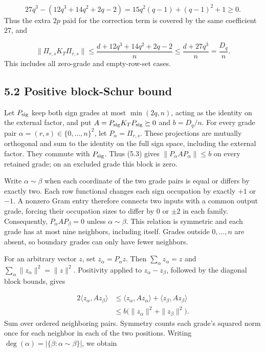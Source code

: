 \documentclass[11pt,a4paper]{article}
\begin{document}
\begin{equation*}
27q^3-(12q^3+14q^2+2q-2)
=15q^2(q-1)+(q-1)^2+1\ge0.
\end{equation*}
Thus the extra \(2p\) paid for the correction term is covered by the same coefficient \(27\), and

\begin{equation}
\|\Pi_{r,s}K_T\Pi_{r,s}\|
\le\frac{d+12q^3+14q^2+2q-2}{n}
\le\frac{d+27q^3}{n}
=\frac{D_q}{n}.
\tag{5.3}
\end{equation}
This includes all zero-grade and empty-row-set cases.

\subsection*{5.2 Positive block-Schur bound}
Let \(P_{\rm sig}\) keep both sign grades at most \(\min(2q,n)\), acting as the identity on the external factor, and put \(A=P_{\rm sig}K_TP_{\rm sig}\succeq0\) and \(b=D_q/n\). For every grade pair \(\alpha=(r,s)\in\{0,\ldots,n\}^2\), let \(P_\alpha=\Pi_{r,s}\). These projections are mutually orthogonal and sum to the identity on the full sign space, including the external factor. They commute with \(P_{\rm sig}\). Thus (5.3) gives \(\|P_\alpha A P_\alpha\|\le b\) on every retained grade; on an excluded grade this block is zero.

Write \(\alpha\sim\beta\) when each coordinate of the two grade pairs is equal or differs by exactly two. Each row functional changes each sign occupation by exactly \(+1\) or \(-1\). A nonzero Gram entry therefore connects two inputs with a common output grade, forcing their occupation sizes to differ by \(0\) or \(\pm2\) in each family. Consequently, \(P_\alpha A P_\beta=0\) unless \(\alpha\sim\beta\). This relation is symmetric and each grade has at most nine neighbors, including itself. Grades outside \(0,\ldots,n\) are absent, so boundary grades can only have fewer neighbors.

For an arbitrary vector \(z\), set \(z_\alpha=P_\alpha z\). Then \(\sum_\alpha z_\alpha=z\) and \(\sum_\alpha\|z_\alpha\|^2=\|z\|^2\). Positivity applied to \(z_\alpha-z_\beta\), followed by the diagonal block bounds, gives

\begin{equation}
\begin{aligned}
2\langle z_\alpha,A z_\beta\rangle
&\le\langle z_\alpha,A z_\alpha\rangle
 +\langle z_\beta,A z_\beta\rangle\\
&\le b\bigl(\|z_\alpha\|^2+\|z_\beta\|^2\bigr).
\end{aligned}
\tag{5.4}
\end{equation}
Sum over ordered neighboring pairs. Symmetry counts each grade's squared norm once for each neighbor in each of the two positions. Writing \(\deg(\alpha)=|\{\beta:\alpha\sim\beta\}|\), we obtain
\end{document}
